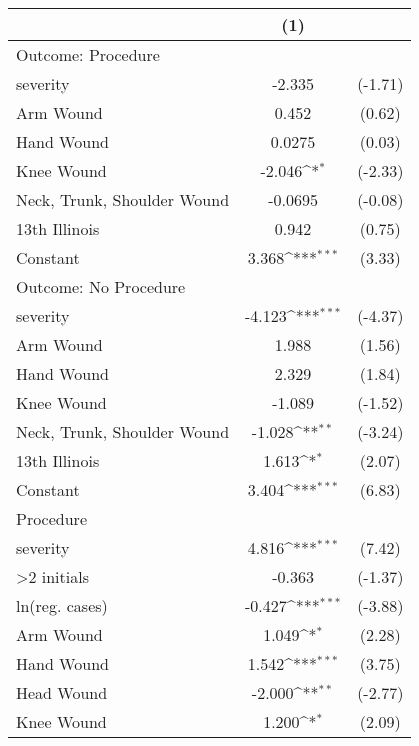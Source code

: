 {
\def\sym#1{\ifmmode^{#1}\else\(^{#1}\)\fi}
\begin{tabular}{l*{1}{cc}}
\hline\hline
                    &\multicolumn{1}{c}{(1)}         &            \\
\hline
Outcome: Procedure  &                     &            \\
severity            &      -2.335         &     (-1.71)\\
Arm Wound           &       0.452         &      (0.62)\\
Hand Wound          &      0.0275         &      (0.03)\\
Knee Wound          &      -2.046\sym{*}  &     (-2.33)\\
Neck, Trunk, Shoulder Wound&     -0.0695         &     (-0.08)\\
13th Illinois       &       0.942         &      (0.75)\\
Constant            &       3.368\sym{***}&      (3.33)\\
\hline
Outcome: No Procedure&                     &            \\
severity            &      -4.123\sym{***}&     (-4.37)\\
Arm Wound           &       1.988         &      (1.56)\\
Hand Wound          &       2.329         &      (1.84)\\
Knee Wound          &      -1.089         &     (-1.52)\\
Neck, Trunk, Shoulder Wound&      -1.028\sym{**} &     (-3.24)\\
13th Illinois       &       1.613\sym{*}  &      (2.07)\\
Constant            &       3.404\sym{***}&      (6.83)\\
\hline
Procedure           &                     &            \\
severity            &       4.816\sym{***}&      (7.42)\\
>2 initials         &      -0.363         &     (-1.37)\\
ln(reg. cases)      &      -0.427\sym{***}&     (-3.88)\\
Arm Wound           &       1.049\sym{*}  &      (2.28)\\
Hand Wound          &       1.542\sym{***}&      (3.75)\\
Head Wound          &      -2.000\sym{**} &     (-2.77)\\
Knee Wound          &       1.200\sym{*}  &      (2.09)\\

\end{tabular}}
